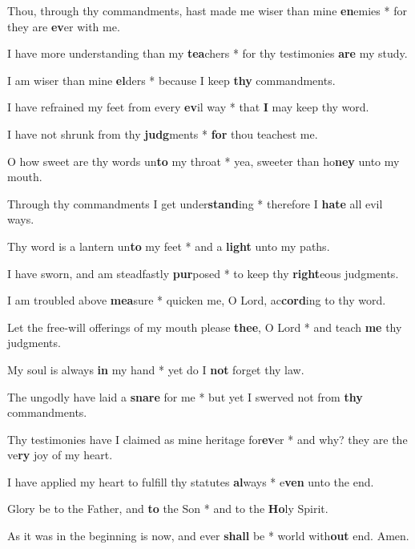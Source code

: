\begin{multicols}{2}
	Thou, through thy commandments, hast made me wiser than mine \textbf{en}emies * for they are \textbf{ev}er with me.
	
	I have more understanding than my \textbf{tea}chers * for thy testimonies \textbf{are} my study.
	
	I am wiser than mine \textbf{el}ders * because I keep \textbf{thy} commandments.
	
	I have refrained my feet from every \textbf{ev}il way * that \textbf{I} may keep thy word.
	
	I have not shrunk from thy \textbf{judg}ments * \textbf{for} thou teachest me.
	
	O how sweet are thy words un\textbf{to} my throat * yea, sweeter than ho\textbf{ney} unto my mouth.
	
	Through thy commandments I get under\textbf{stand}ing * therefore I \textbf{hate} all evil ways.
	
	Thy word is a lantern un\textbf{to} my feet * and a \textbf{light} unto my paths.
	
	I have sworn, and am steadfastly \textbf{pur}posed * to keep thy \textbf{right}eous judgments.
	
	I am troubled above \textbf{mea}sure * quicken me, O Lord, ac\textbf{cord}ing to thy word.
	
	Let the free-will offerings of my mouth please \textbf{thee}, O Lord * and teach \textbf{me} thy judgments.
	
	My soul is always \textbf{in} my hand * yet do I \textbf{not} forget thy law.
	
	The ungodly have laid a \textbf{snare} for me * but yet I swerved not from \textbf{thy} commandments.
	
	Thy testimonies have I claimed as mine heritage for\textbf{ev}er * and why? they are the ve\textbf{ry} joy of my heart.
	
	I have applied my heart to fulfill thy statutes \textbf{al}ways * e\textbf{ven} unto the end.
	
	Glory be to the Father, and \textbf{to} the Son * and to the \textbf{Ho}ly Spirit.
	
	As it was in the beginning is now, and ever \textbf{shall} be * world with\textbf{out} end. Amen.
\end{multicols}